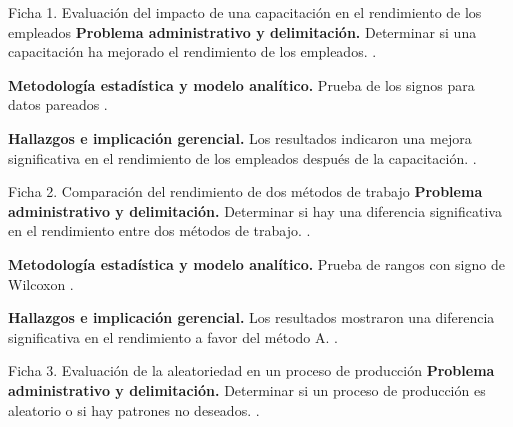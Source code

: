 {
\begin{fichainvestigacion}{Ficha 1. Evaluación del impacto de una capacitación en el rendimiento de los empleados}
\textbf{Problema administrativo y delimitación.} Determinar si una capacitación ha mejorado el rendimiento de los empleados. \citep{anderson2012,holmesBusiness2023}.

\textbf{Metodología estadística y modelo analítico.} Prueba de los signos para datos pareados \citep{wackerly2010,lind2012}.

\textbf{Hallazgos e implicación gerencial.} Los resultados indicaron una mejora significativa en el rendimiento de los empleados después de la capacitación. \citep{nistHandbook}.
\end{fichainvestigacion}

\begin{fichainvestigacion}{Ficha 2. Comparación del rendimiento de dos métodos de trabajo}
\textbf{Problema administrativo y delimitación.} Determinar si hay una diferencia significativa en el rendimiento entre dos métodos de trabajo. \citep{anderson2012,holmesBusiness2023}.

\textbf{Metodología estadística y modelo analítico.} Prueba de rangos con signo de Wilcoxon \citep{wackerly2010,lind2012}.

\textbf{Hallazgos e implicación gerencial.} Los resultados mostraron una diferencia significativa en el rendimiento a favor del método A. \citep{nistHandbook}.
\end{fichainvestigacion}

\begin{fichainvestigacion}{Ficha 3. Evaluación de la aleatoriedad en un proceso de producción}
\textbf{Problema administrativo y delimitación.} Determinar si un proceso de producción es aleatorio o si hay patrones no deseados. \citep{anderson2012,holmesBusiness2023}.


\end{fichainvestigacion}}
